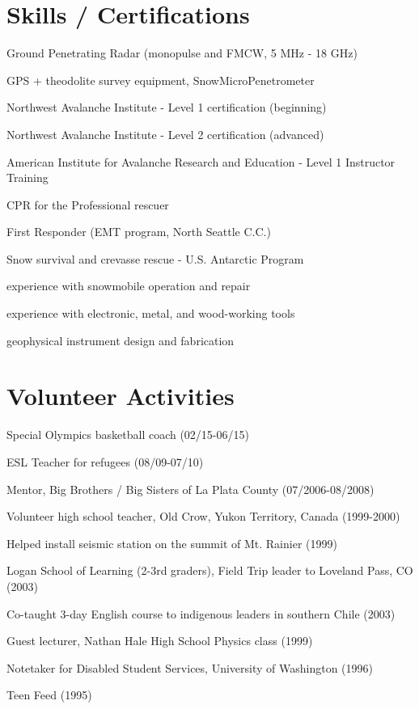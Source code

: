\documentclass[11pt]{article}
\renewenvironment{itemize}{
  \begin{list}{}{
    \setlength{\leftmargin}{1.5em}
    \setlength{\itemsep}{0pt}
    \setlength{\parskip}{0pt}
  }
}{
  \end{list}
}
\begin{document}
\section*{Skills / Certifications}
\begin{itemize}
\item Ground Penetrating Radar (monopulse and FMCW, 5 MHz - 18 GHz)
\item GPS + theodolite survey equipment, SnowMicroPenetrometer
\item Northwest Avalanche Institute - Level 1 certification (beginning)
\item Northwest Avalanche Institute - Level 2 certification (advanced)
\item American Institute for Avalanche Research and Education - Level 1 Instructor Training
\item CPR for the Professional rescuer
\item First Responder (EMT program, North Seattle C.C.)
\item Snow survival and crevasse rescue - U.S. Antarctic Program
\item experience with snowmobile operation and repair
\item experience with electronic, metal, and wood-working tools
\item geophysical instrument design and fabrication
\end{itemize}

\section*{Volunteer Activities}
\begin{itemize}
\item Special Olympics basketball coach (02/15-06/15)
\item ESL Teacher for refugees (08/09-07/10)
\item Mentor, Big Brothers / Big Sisters of La Plata County (07/2006-08/2008)
\item Volunteer high school teacher, Old Crow, Yukon Territory, Canada (1999-2000)
\item Helped install seismic station on the summit of Mt. Rainier (1999)
\item Logan School of Learning (2-3rd graders), Field Trip leader to Loveland Pass, CO (2003)
\item Co-taught 3-day English course to indigenous leaders in southern Chile (2003)
\item Guest lecturer, Nathan Hale High School Physics class (1999)
\item Notetaker for Disabled Student Services, University of Washington (1996)
\item Teen Feed (1995)
\end{itemize}
\end{document}
